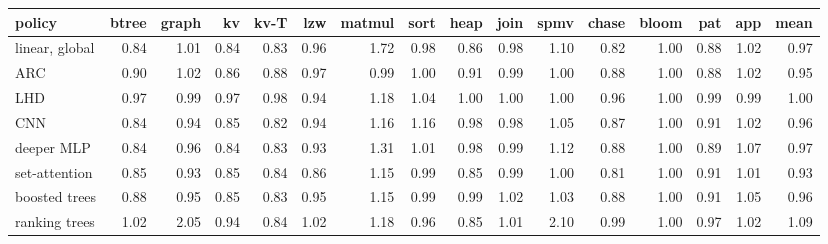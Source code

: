 \begin{tabular}{lrrrrrrrrrrrrrrr}
\toprule
policy & btree & graph & kv & kv-T & lzw & matmul & sort & heap & join & spmv & chase & bloom & pat & app & mean \\
\midrule
linear, global & 0.84 & 1.01 & 0.84 & 0.83 & 0.96 & 1.72 & 0.98 & 0.86 & 0.98 & 1.10 & 0.82 & 1.00 & 0.88 & 1.02 & 0.97 \\
ARC & 0.90 & 1.02 & 0.86 & 0.88 & 0.97 & 0.99 & 1.00 & 0.91 & 0.99 & 1.00 & 0.88 & 1.00 & 0.88 & 1.02 & 0.95 \\
LHD & 0.97 & 0.99 & 0.97 & 0.98 & 0.94 & 1.18 & 1.04 & 1.00 & 1.00 & 1.00 & 0.96 & 1.00 & 0.99 & 0.99 & 1.00 \\
CNN & 0.84 & 0.94 & 0.85 & 0.82 & 0.94 & 1.16 & 1.16 & 0.98 & 0.98 & 1.05 & 0.87 & 1.00 & 0.91 & 1.02 & 0.96 \\
deeper MLP & 0.84 & 0.96 & 0.84 & 0.83 & 0.93 & 1.31 & 1.01 & 0.98 & 0.99 & 1.12 & 0.88 & 1.00 & 0.89 & 1.07 & 0.97 \\
set-attention & 0.85 & 0.93 & 0.85 & 0.84 & 0.86 & 1.15 & 0.99 & 0.85 & 0.99 & 1.00 & 0.81 & 1.00 & 0.91 & 1.01 & 0.93 \\
boosted trees & 0.88 & 0.95 & 0.85 & 0.83 & 0.95 & 1.15 & 0.99 & 0.99 & 1.02 & 1.03 & 0.88 & 1.00 & 0.91 & 1.05 & 0.96 \\
ranking trees & 1.02 & 2.05 & 0.94 & 0.84 & 1.02 & 1.18 & 0.96 & 0.85 & 1.01 & 2.10 & 0.99 & 1.00 & 0.97 & 1.02 & 1.09 \\
\bottomrule
\end{tabular}
